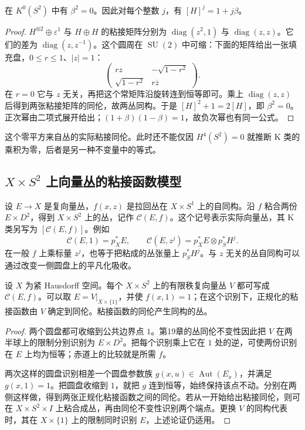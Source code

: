 \begin{lemma}\label{g2:lem:bott-square-zero}
	在 \(K^0(S^2)\) 中有 \(\beta^2=0\)。因此对每个整数 \(j\)，有 \([H]^j=1+j\beta\)。
\end{lemma}
\begin{proof}
	\(H^{\otimes2}\oplus\varepsilon^1\) 与 \(H\oplus H\) 的粘接矩阵分别为 \(\operatorname{diag}(z^2,1)\) 与 \(\operatorname{diag}(z,z)\)。它们的差为 \(\operatorname{diag}(z,z^{-1})\)。这个圆周在 \(\operatorname{SU}(2)\) 中可缩：下面的矩阵给出一张填充盘，\(0\le r\le1\)、\(|z|=1\)：
	\[
		\begin{pmatrix}
			rz&-\sqrt{1-r^2}\\
			\sqrt{1-r^2}&r\overline z
		\end{pmatrix}.
	\]
	在 \(r=0\) 它与 \(z\) 无关，再把这个常矩阵沿旋转连到恒等即可。乘上 \(\operatorname{diag}(z,z)\) 后得到两张粘接矩阵的同伦，故两丛同构。于是 \([H]^2+1=2[H]\)，即 \(\beta^2=0\)。正次幂由二项式展开给出；\((1+\beta)(1-\beta)=1\)，故负次幂也有同一公式。
\end{proof}

这个零平方来自丛的实际粘接同伦。此时还不能仅因 \(H^4(S^2)=0\) 就推断 K 类的乘积为零，后者是另一种不变量中的等式。

\subsection{\texorpdfstring{\(X\times S^2\) 上向量丛的粘接函数模型}{X×S² 上向量丛的粘接函数模型}}
\label{g2:subsec:2403:02}
设 \(E\to X\) 是复向量丛，\(f(x,z)\) 是拉回丛在 \(X\times S^1\) 上的自同构。沿 \(f\) 粘合两份 \(E\times D^2\)，得到 \(X\times S^2\) 上的丛，记作 \(\mathcal C(E,f)\)。这个记号表示实际向量丛，其 K 类另写为 \([\mathcal C(E,f)]\)。例如
\begin{equation}\label{g2:eq:k-clutching-products}
	\mathcal C(E,1)=p_X^*E,\qquad
	\mathcal C(E,z^j)=p_X^*E\otimes p_S^*H^j.
\end{equation}
在一般 \(f\) 上乘标量 \(z^j\)，也等于把粘成的丛张量上 \(p_S^*H^j\)。与 \(z\) 无关的丛自同构可以通过改变一侧圆盘上的平凡化吸收。

\begin{proposition}\label{g2:prop:k-parametric-clutching}
	设 \(X\) 为紧 Hausdorff 空间。每个 \(X\times S^2\) 上的有限秩复向量丛 \(V\) 都可写成 \(\mathcal C(E,f)\)。可以取 \(E=V|_{X\times\{1\}}\)，并使 \(f(x,1)=1\)；在这个识别下，正规化的粘接函数由 \(V\) 确定到同伦。粘接函数的同伦产生同构的丛。
\end{proposition}
\begin{proof}
	两个圆盘都可收缩到公共边界点 \(1\)。第19章的丛同伦不变性因此把 \(V\) 在两半球上的限制分别识别为 \(E\times D^2\)。把每个识别乘上它在 \(1\) 处的逆，可使两份识别在 \(E\) 上均为恒等；赤道上的比较就是所需 \(f\)。

	两次这样的圆盘识别相差一个圆盘参数族 \(g(x,u)\in\operatorname{Aut}(E_x)\)，并满足 \(g(x,1)=1\)。把圆盘收缩到 \(1\)，就把 \(g\) 连到恒等，始终保持该点不动。分别在两侧这样做，得到两张正规化粘接函数之间的同伦。若从一开始给出粘接同伦，则可在 \(X\times S^2\times I\) 上粘合成丛，再由同伦不变性识别两个端点。更换 \(V\) 的同构代表时，其在 \(X\times\{1\}\) 上的限制同时识别 \(E\)，上述论证仍适用。
\end{proof}

